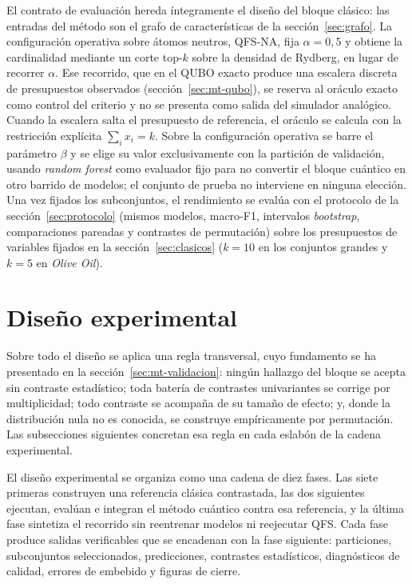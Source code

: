 El contrato de evaluación hereda íntegramente el diseño del bloque
clásico: las entradas del método son el grafo de características de la
sección~\ref{sec:grafo}. La configuración operativa sobre átomos neutros, QFS-NA, fija
$\alpha=0{,}5$ y obtiene la cardinalidad mediante un corte top-$k$ sobre
la densidad de Rydberg, en lugar de recorrer $\alpha$. Ese recorrido,
que en el QUBO exacto produce una escalera discreta de presupuestos
observados (sección~\ref{sec:mt-qubo}), se reserva al oráculo exacto
como control del criterio y no se presenta como salida del simulador
analógico. Cuando la escalera salta el presupuesto de referencia, el
oráculo se calcula con la restricción explícita $\sum_i x_i=k$. Sobre
la configuración operativa se barre el parámetro $\beta$ y se elige su
valor exclusivamente con la partición de validación, usando
\textit{random forest} como evaluador fijo para no convertir el bloque
cuántico en otro barrido de modelos; el conjunto de prueba no interviene
en ninguna elección. Una vez fijados los subconjuntos, el rendimiento se
evalúa con el protocolo de la sección~\ref{sec:protocolo} (mismos
modelos, macro-F1, intervalos \textit{bootstrap}, comparaciones pareadas
y contrastes de permutación) sobre los presupuestos de variables
fijados en la sección~\ref{sec:clasicos} ($k=10$ en los conjuntos
grandes y $k=5$ en \textit{Olive Oil}).

\section{Diseño experimental}
\label{sec:diseno}

Sobre todo el diseño se aplica una regla transversal, cuyo fundamento
se ha presentado en la sección~\ref{sec:mt-validacion}: ningún
hallazgo del bloque se acepta sin contraste estadístico; toda batería
de contrastes univariantes se corrige por multiplicidad; todo
contraste se acompaña de su tamaño de efecto; y, donde la distribución
nula no es conocida, se construye empíricamente por permutación. Las
subsecciones siguientes concretan esa regla en cada eslabón de la
cadena experimental.

El diseño experimental se organiza como una cadena de diez fases. Las
siete primeras construyen una referencia clásica contrastada, las dos
siguientes ejecutan, evalúan e integran el método cuántico contra esa
referencia, y la última fase sintetiza el recorrido sin reentrenar
modelos ni reejecutar QFS\@. Cada fase produce salidas verificables que se
encadenan con la fase siguiente: particiones, subconjuntos
seleccionados, predicciones, contrastes estadísticos, diagnósticos de
calidad, errores de embebido y figuras de cierre.

